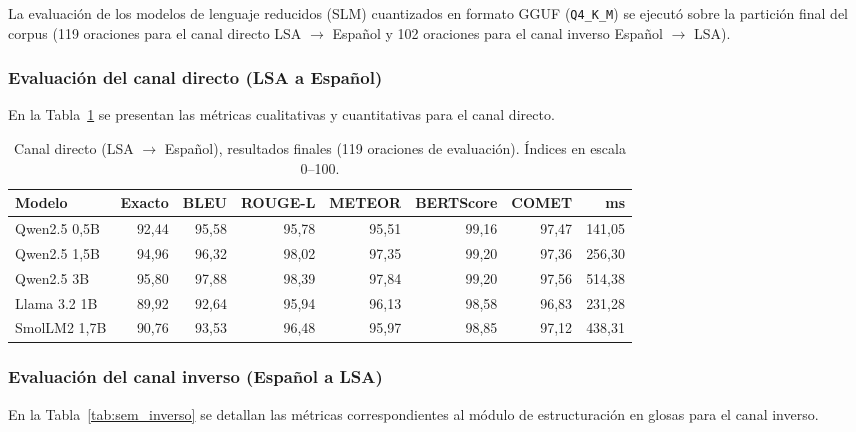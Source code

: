 La evaluación de los modelos de lenguaje reducidos (SLM) cuantizados en formato GGUF (\texttt{Q4\_K\_M}) se ejecutó sobre la partición final del corpus (119 oraciones para el canal directo LSA $\rightarrow$ Español y 102 oraciones para el canal inverso Español $\rightarrow$ LSA).

\subsubsection{Evaluación del canal directo (LSA a Español)}
En la Tabla~\ref{tab:sem_directo} se presentan las métricas cualitativas y cuantitativas para el canal directo.

\begin{table}[H]
\centering
\footnotesize
\caption{Canal directo (LSA $\rightarrow$ Español), resultados finales (119 oraciones de evaluación). Índices en escala 0--100.}
\label{tab:sem_directo}
\begin{tabular}{lrrrrrrr}
\toprule
\textbf{Modelo} & \textbf{Exacto} & \textbf{BLEU} & \textbf{ROUGE-L} & \textbf{METEOR} & \textbf{BERTScore} & \textbf{COMET} & \textbf{ms} \\
\midrule
Qwen2.5 0,5B & 92,44 & 95,58 & 95,78 & 95,51 & 99,16 & 97,47 & 141,05 \\
Qwen2.5 1,5B & 94,96 & 96,32 & 98,02 & 97,35 & 99,20 & 97,36 & 256,30 \\
Qwen2.5 3B   & 95,80 & 97,88 & 98,39 & 97,84 & 99,20 & 97,56 & 514,38 \\
Llama 3.2 1B & 89,92 & 92,64 & 95,94 & 96,13 & 98,58 & 96,83 & 231,28 \\
SmolLM2 1,7B & 90,76 & 93,53 & 96,48 & 95,97 & 98,85 & 97,12 & 438,31 \\
\bottomrule
\end{tabular}
\end{table}

\subsubsection{Evaluación del canal inverso (Español a LSA)}
En la Tabla~\ref{tab:sem_inverso} se detallan las métricas correspondientes al módulo de estructuración en glosas para el canal inverso.

